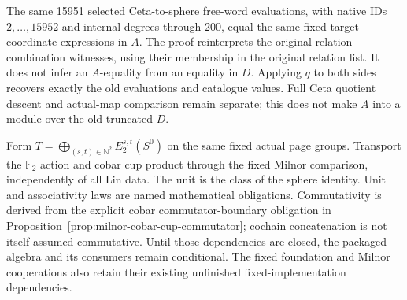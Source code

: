 \begin{lemma}
  \label{lem:lin-naturality-words200-native}
  \leanok
  The same 15951 selected Ceta-to-sphere free-word evaluations, with
  native IDs $2,\ldots,15952$ and internal degrees through 200, equal
  the same fixed target-coordinate expressions in $A$. The proof
  reinterprets the original relation-combination witnesses, using their
  membership in the original relation list. It does not infer an
  $A$-equality from an equality in $D$. Applying $q$ to both sides
  recovers exactly the old evaluations and catalogue values.
  Full Ceta quotient descent and actual-map comparison remain separate;
  this does not make $A$ into a module over the old truncated $D$.
\end{lemma}

\begin{definition}
  \label{def:sphere-global-e2-algebra}
  \notready
  Form $T=\bigoplus_{(s,t)\in\mathbb N^2}E_2^{s,t}(S^0)$ on the
  same fixed actual page groups. Transport the $\mathbb F_2$ action
  and cobar cup product through the fixed Milnor comparison, independently
  of all Lin data. The unit is the class of the sphere identity.
  Unit and associativity laws are named mathematical obligations.
  Commutativity is derived from the explicit cobar commutator-boundary
  obligation in Proposition~\ref{prop:milnor-cobar-cup-commutator};
  cochain concatenation is not itself assumed commutative. Until those dependencies are closed, the packaged
  algebra and its consumers remain conditional. The fixed foundation
  and Milnor cooperations also retain their existing unfinished
  fixed-implementation dependencies.
\end{definition}

